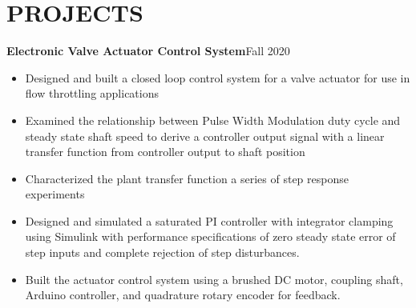 \documentclass{article}
\begin{document}
\section{PROJECTS}
\textbf{Electronic Valve Actuator Control System}\hfill Fall 2020
\vspace{0.5em}
\begin{itemize}
	\item Designed and built a closed loop control system for a valve actuator for use in flow throttling applications
	\item Examined the relationship between Pulse Width Modulation duty cycle and steady state shaft speed to derive a controller output signal with a linear transfer function from controller output to shaft position  
	\item Characterized the plant transfer function a series of step response experiments
	\item  Designed and simulated a saturated PI controller with integrator clamping using Simulink with performance specifications of zero steady state error of step inputs and complete rejection of step disturbances.
	\item  Built the actuator control system using a brushed DC motor, coupling shaft, Arduino controller, and quadrature rotary encoder for feedback.
\end{itemize}
\vspace{0.5em}
\thispagestyle{empty}
\end{document}
